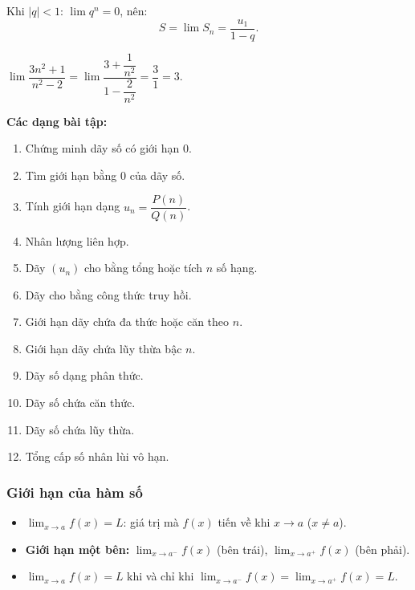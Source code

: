 \documentclass[12pt,a4paper]{article}
\begin{document}
\begin{congthuc}[title={Cấp số nhân lùi vô hạn}]
  Khi $|q| < 1$: \;$\lim q^n = 0$, nên:
  \[
    S = \lim S_n = \dfrac{u_1}{1 - q}.
  \]
\end{congthuc}

\begin{vidu}
  $\displaystyle\lim \dfrac{3n^2 + 1}{n^2 - 2}
  = \lim \dfrac{3 + \dfrac{1}{n^2}}{1 - \dfrac{2}{n^2}}
  = \dfrac{3}{1} = 3.$
\end{vidu}

\medskip\noindent\textbf{Các dạng bài tập:}
\begin{enumerate}[label=\textbf{Dạng \arabic*:}, leftmargin=*, align=left]
  \item Chứng minh dãy số có giới hạn $0$.
  \item Tìm giới hạn bằng $0$ của dãy số.
  \item Tính giới hạn dạng $u_n = \dfrac{P(n)}{Q(n)}$.
  \item Nhân lượng liên hợp.
  \item Dãy $(u_n)$ cho bằng tổng hoặc tích $n$ số hạng.
  \item Dãy cho bằng công thức truy hồi.
  \item Giới hạn dãy chứa đa thức hoặc căn theo $n$.
  \item Giới hạn dãy chứa lũy thừa bậc $n$.
  \item Dãy số dạng phân thức.
  \item Dãy số chứa căn thức.
  \item Dãy số chứa lũy thừa.
  \item Tổng cấp số nhân lùi vô hạn.
\end{enumerate}

\subsubsection{Giới hạn của hàm số}

\begin{dinhnghia}
  \begin{itemize}
    \item $\displaystyle\lim_{x \to a} f(x) = L$: giá trị mà $f(x)$ tiến về khi $x \to a$ \;($x \ne a$).
    \item \textbf{Giới hạn một bên:}
      $\displaystyle\lim_{x \to a^-} f(x)$ (bên trái), \quad
      $\displaystyle\lim_{x \to a^+} f(x)$ (bên phải).
    \item $\displaystyle\lim_{x \to a} f(x) = L$ khi và chỉ khi
      $\displaystyle\lim_{x \to a^-} f(x) = \lim_{x \to a^+} f(x) = L$.
  \end{itemize}
\end{dinhnghia}
\end{document}
